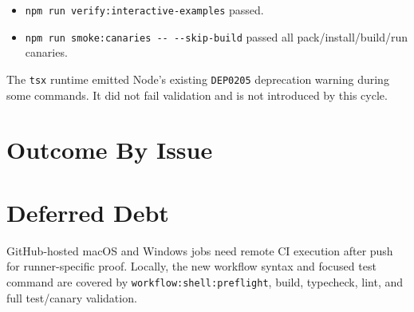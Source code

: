 \begin{itemize}
\item
  \texttt{n\allowbreak{}p\allowbreak{}m\allowbreak{} \allowbreak{}r\allowbreak{}u\allowbreak{}n\allowbreak{} \allowbreak{}v\allowbreak{}e\allowbreak{}r\allowbreak{}i\allowbreak{}f\allowbreak{}y\allowbreak{}:\allowbreak{}i\allowbreak{}n\allowbreak{}t\allowbreak{}e\allowbreak{}r\allowbreak{}a\allowbreak{}c\allowbreak{}t\allowbreak{}i\allowbreak{}v\allowbreak{}e\allowbreak{}-\allowbreak{}e\allowbreak{}x\allowbreak{}a\allowbreak{}m\allowbreak{}p\allowbreak{}l\allowbreak{}e\allowbreak{}s} passed.
\item
  \texttt{n\allowbreak{}p\allowbreak{}m\allowbreak{} \allowbreak{}r\allowbreak{}u\allowbreak{}n\allowbreak{} \allowbreak{}s\allowbreak{}m\allowbreak{}o\allowbreak{}k\allowbreak{}e\allowbreak{}:\allowbreak{}c\allowbreak{}a\allowbreak{}n\allowbreak{}a\allowbreak{}r\allowbreak{}i\allowbreak{}e\allowbreak{}s\allowbreak{} \allowbreak{}-\allowbreak{}-\allowbreak{} \allowbreak{}-\allowbreak{}-\allowbreak{}s\allowbreak{}k\allowbreak{}i\allowbreak{}p\allowbreak{}-\allowbreak{}b\allowbreak{}u\allowbreak{}i\allowbreak{}l\allowbreak{}d} passed all pack/install/build/run canaries.
\end{itemize}

The \texttt{t\allowbreak{}s\allowbreak{}x} runtime emitted Node's existing \texttt{D\allowbreak{}E\allowbreak{}P\allowbreak{}0\allowbreak{}2\allowbreak{}0\allowbreak{}5} deprecation warning during some commands. It did not fail validation and is not introduced by this cycle.

\section{Outcome By Issue}\label{record-407-outcome-by-issue}



\section{Deferred Debt}\label{record-407-deferred-debt}

GitHub-hosted macOS and Windows jobs need remote CI execution after push for runner-specific proof. Locally, the new workflow syntax and focused test command are covered by \texttt{w\allowbreak{}o\allowbreak{}r\allowbreak{}k\allowbreak{}f\allowbreak{}l\allowbreak{}o\allowbreak{}w\allowbreak{}:\allowbreak{}s\allowbreak{}h\allowbreak{}e\allowbreak{}l\allowbreak{}l\allowbreak{}:\allowbreak{}p\allowbreak{}r\allowbreak{}e\allowbreak{}f\allowbreak{}l\allowbreak{}i\allowbreak{}g\allowbreak{}h\allowbreak{}t}, build, typecheck, lint, and full test/canary validation.

